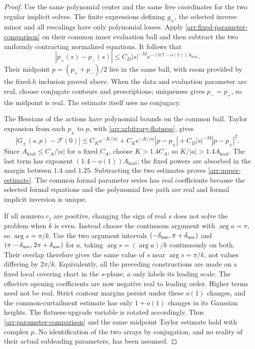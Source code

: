 \begin{proof}
Use the same polynomial center and the same free
coordinates for the two regular implicit solves.
The finite expressions defining \(g_\pm\), the selected
inverse minor and all rescalings have only polynomial
losses.  Apply \eqref{arr:fixed-parameter-comparison} on
their common inner evaluation ball and then subtract the
two uniformly contracting normalized equations.
It follows that
\begin{equation}\label{arr:parameter-comparison}
 |p_+(s)-p_-(s)|
      \le C_D|s|^{-M}e^{-(0.7-o(1))A_{\mathrm{lead}}}.
\end{equation}
Their midpoint \(p=(p_++p_-)/2\) lies in the same ball, with room
provided by the fixed-$h$ inclusion proved above.
When the data and evaluation parameter are real, choose
conjugate contours and prescriptions; uniqueness gives
\(p_-=\overline{p_+}\), so the midpoint is real.
The estimate itself uses no conjugacy.

The Hessians of the actions have polynomial bounds on
the common ball.  Taylor expansion from each \(p_\pm\)
to \(p\), with \eqref{arr:arbitrary-flatness}, gives
\[
 |G_\pm(s,p)-\mathcal F(0)|
 \le C_K e^{-K/|a|}
      +C_K e^{-K/|a|}|p-p_\pm|
      +C_D|s|^{-M}|p-p_\pm|^2.
\]
Since \(A_{\mathrm{lead}}\le C_A/|a|\) for a fixed $C_A$, choose
$K>1.4C_A$, so $K/|a|>1.4A_{\mathrm{lead}}$.
The last term has exponent
\((1.4-o(1))A_{\mathrm{lead}}\); the fixed powers are absorbed in the
margin between \(1.4\) and \(1.25\).
Subtracting the two estimates proves
\eqref{arr:upper-estimate}.
The common formal parameter series has real coefficients
because the selected formal equations and the polynomial
free path are real and formal implicit inversion is unique.

If all nonzero \(c_j\) are positive, changing the sign
of real \(s\) does not solve the problem when \(k\) is
even.  Instead choose the continuous argument with
\(\arg a=\pi\), so \(\arg s=\pi/k\).
Use the two argument intervals
\((-\delta_{\rm use},\pi+\delta_{\rm use})\) and
\((\pi-\delta_{\rm use},2\pi+\delta_{\rm use})\) for \(a\), taking
\(\arg s=(\arg a)/k\) continuously on both.  Their
overlap therefore gives the same value of \(s\) near
\(\arg s=\pi/k\), not values differing by \(2\pi/k\).
Equivalently, all the preceding constructions are made
on a fixed local covering chart in the \(s\)-plane;
\(a\) only labels its leading scale.
The effective opening coefficients are now negative
real to leading order.  Higher terms need not be real.
Strict contour margins persist under these \(o(1)\)
changes, and the common-curtailment estimate has only
\(1+o(1)\) changes in its Gaussian heights.
The flatness-upgrade variable is rotated accordingly.
Thus \eqref{arr:parameter-comparison} and the same
midpoint Taylor estimate hold with complex \(p\).
No identification of the two arrays by conjugation,
and no reality of their actual subleading parameters,
has been assumed.


\end{proof}
